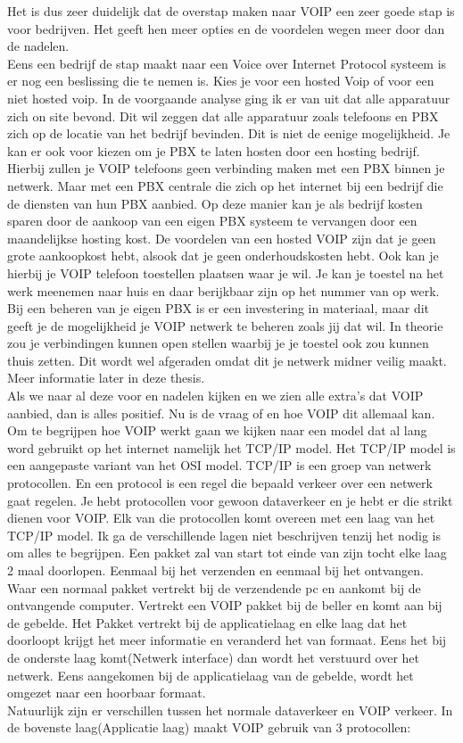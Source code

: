 \documentclass[pdftex,a4paper,12pt,twoside]{report}
\begin{document}
Het is dus zeer duidelijk dat de overstap maken naar VOIP een zeer goede stap is voor bedrijven. Het geeft hen meer opties en de voordelen wegen meer door dan de nadelen. \\
Eens een bedrijf de stap maakt naar een Voice over Internet Protocol systeem is er nog een beslissing die te nemen is. Kies je voor een hosted Voip of voor een niet hosted voip.
In de voorgaande analyse ging ik er van uit dat alle apparatuur zich on site bevond. Dit wil zeggen dat alle apparatuur zoals telefoons en PBX zich op de locatie van het bedrijf bevinden.
Dit is niet de eenige mogelijkheid. Je kan er ook voor kiezen om je PBX te laten hosten door een hosting bedrijf. Hierbij zullen je VOIP telefoons geen verbinding maken met een PBX binnen je netwerk.
Maar met een PBX centrale die zich op het internet bij een bedrijf die de diensten van hun PBX aanbied. Op deze manier kan je als bedrijf kosten sparen door de aankoop van een eigen PBX systeem te vervangen door een maandelijkse hosting kost.
De voordelen van een hosted VOIP zijn dat je geen grote aankoopkost hebt, alsook dat je geen onderhoudskosten hebt. Ook kan je hierbij je VOIP telefoon toestellen plaatsen waar je wil. Je kan je toestel na het werk meenemen naar huis en daar berijkbaar zijn op het nummer van op werk.
Bij een beheren van je eigen PBX is er een investering in materiaal, maar dit geeft je de mogelijkheid je VOIP netwerk te beheren zoals jij dat wil. In theorie zou je verbindingen kunnen open stellen waarbij je je toestel ook zou kunnen thuis zetten. Dit wordt wel afgeraden omdat dit je netwerk midner veilig maakt. Meer informatie later in deze thesis.
\\
Als we naar al deze voor en nadelen kijken en we zien alle extra's dat VOIP aanbied, dan is alles positief. Nu is de vraag of en hoe VOIP dit allemaal kan. Om te begrijpen hoe VOIP werkt gaan we kijken naar een model dat al lang word gebruikt op het internet namelijk het TCP/IP model. Het TCP/IP model is een aangepaste variant van het OSI model.
TCP/IP is een groep van netwerk protocollen. En een protocol is een regel die bepaald verkeer over een netwerk gaat regelen. Je hebt protocollen voor gewoon dataverkeer en je hebt er die strikt dienen voor VOIP. Elk van die protocollen komt overeen met een laag van het TCP/IP model. Ik ga de verschillende lagen niet beschrijven tenzij het nodig is om alles te begrijpen.
Een pakket zal van start tot einde van zijn tocht elke laag 2 maal doorlopen. Eenmaal bij het verzenden en eenmaal bij het ontvangen. Waar een normaal pakket vertrekt bij de verzendende pc en aankomt bij de ontvangende computer. Vertrekt een VOIP pakket bij de beller en komt aan bij de gebelde.
Het Pakket vertrekt bij de applicatielaag en elke laag dat het doorloopt krijgt het meer informatie en veranderd het van formaat. Eens het bij de onderste laag komt(Netwerk interface) dan wordt het verstuurd over het netwerk. Eens aangekomen bij de applicatielaag van de gebelde, wordt het omgezet naar een hoorbaar formaat.
\\
Natuurlijk zijn er verschillen tussen het normale dataverkeer en VOIP verkeer. In de bovenste laag(Applicatie laag) maakt VOIP gebruik van 3 protocollen:
\end{document}
